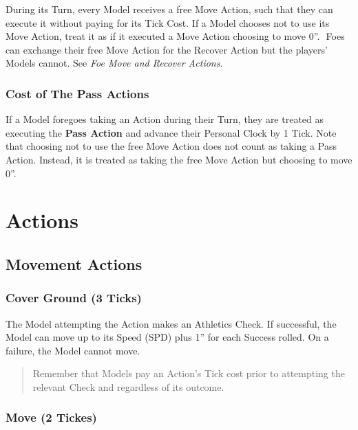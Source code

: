 \documentclass[
]{book}
\begin{document}
During its Turn, every Model receives a free Move Action, such that they can execute it without paying for its Tick Cost. If a Model chooses not to use its Move Action, treat it as if it executed a Move Action choosing to move 0''. 
Foes can exchange their free Move Action for the Recover Action but the players' Models cannot. See \emph{Foe Move and Recover Actions}.

\hypertarget{cost-of-the-pass-actions}{%
\subsubsection*{Cost of The Pass Actions}\label{cost-of-the-pass-actions}}

If a Model foregoes taking an Action during their Turn, they are treated as executing the \textbf{Pass Action} and advance their Personal Clock by 1 Tick. Note that choosing not to use the free Move Action does not count as taking a Pass Action. Instead, it is treated as taking the free Move Action but choosing to move 0''.

\hypertarget{actions}{%
\section{Actions}\label{actions}}

\hypertarget{movement-actions}{%
\subsection{Movement Actions}\label{movement-actions}}

\hypertarget{cover-ground-3-ticks}{%
\subsubsection*{Cover Ground (3 Ticks)}\label{cover-ground-3-ticks}}

The Model attempting the Action makes an Athletics Check. If successful, the Model can move up to its Speed (SPD) plus 1'' for each Success rolled. On a failure, the Model cannot move.

\begin{quote}
Remember that Models pay an Action's Tick cost prior to attempting the relevant Check and regardless of its outcome.
\end{quote}

\hypertarget{move-2-tickes}{%
\subsubsection*{Move (2 Tickes)}\label{move-2-tickes}}
\end{document}

